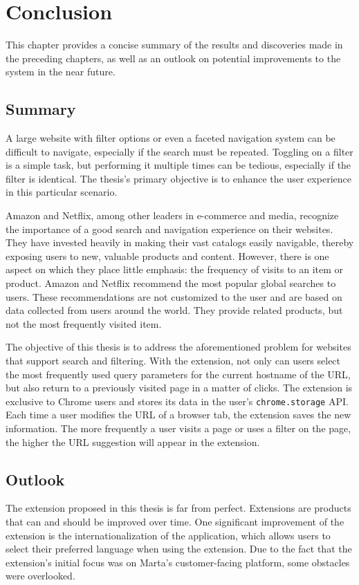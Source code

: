 \newpage
\chapter{Conclusion}
This chapter provides a concise summary of the results and discoveries made in the preceding chapters, as well as an outlook on potential improvements to the system in the near future.

\section{Summary}
A large website with filter options or even a faceted navigation system can be difficult to navigate, especially if the search must be repeated. Toggling on a filter is a simple task, but performing it multiple times can be tedious, especially if the filter is identical. The thesis's primary objective is to enhance the user experience in this particular scenario.

Amazon and Netflix, among other leaders in e-commerce and media, recognize the importance of a good search and navigation experience on their websites. They have invested heavily in making their vast catalogs easily navigable, thereby exposing users to new, valuable products and content. However, there is one aspect on which they place little emphasis: the frequency of visits to an item or product. Amazon and Netflix recommend the most popular global searches to users. These recommendations are not customized to the user and are based on data collected from users around the world. They provide related products, but not the most frequently visited item.

The objective of this thesis is to address the aforementioned problem for websites that support search and filtering. With the extension, not only can users select the most frequently used query parameters for the current hostname of the URL, but also return to a previously visited page in a matter of clicks. The extension is exclusive to Chrome users and stores its data in the user's \texttt{chrome.storage} API. Each time a user modifies the URL of a browser tab, the extension saves the new information. The more frequently a user visits a page or uses a filter on the page, the higher the URL suggestion will appear in the extension.

\section{Outlook}
The extension proposed in this thesis is far from perfect. Extensions are products that can and should be improved over time. One significant improvement of the extension is the internationalization of the application, which allows users to select their preferred language when using the extension. Due to the fact that the extension's initial focus was on Marta's customer-facing platform, some obstacles were overlooked.

